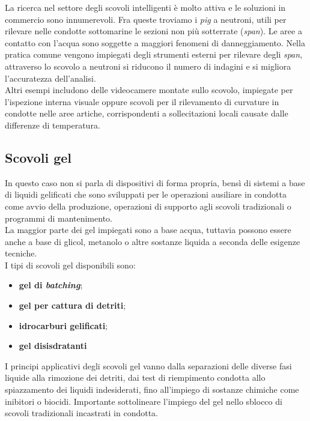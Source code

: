 La ricerca nel settore degli scovoli intelligenti è molto attiva e le soluzioni in commercio sono innumerevoli. Fra queste troviamo i \textit{pig} a neutroni, utili per rilevare nelle condotte sottomarine le sezioni non più sotterrate (\textit{span}). Le aree a contatto con l'acqua sono soggette a maggiori fenomeni di danneggiamento. Nella pratica comune vengono impiegati degli strumenti esterni per rilevare degli \textit{span}, attraverso lo scovolo a neutroni si riducono il numero di indagini e si migliora l'accuratezza dell'analisi.\\
Altri esempi includono delle videocamere montate sullo scovolo, impiegate per l'ispezione interna visuale oppure scovoli per il rilevamento di curvature in condotte nelle aree artiche, corrispondenti a sollecitazioni locali causate dalle differenze di temperatura.

\subsection{Scovoli gel}
In questo caso non si parla di dispositivi di forma propria, bensì di sistemi a base di liquidi gelificati che sono sviluppati per le operazioni ausiliare in condotta come avvio della produzione, operazioni di supporto agli scovoli tradizionali o programmi di mantenimento.\\
La maggior parte dei gel impiegati sono a base acqua, tuttavia possono essere anche a base di glicol, metanolo o altre sostanze liquida a seconda delle esigenze tecniche.\\
I tipi di scovoli gel disponibili sono:
\begin{itemize}
	\item \textbf{gel di \textit{batching}};
	\item \textbf{gel per cattura di detriti};
	\item \textbf{idrocarburi gelificati};
	\item \textbf{gel disisdratanti}
\end{itemize}

I principi applicativi degli scovoli gel vanno dalla separazioni delle diverse fasi liquide alla rimozione dei detriti, dai test di riempimento condotta allo spiazzamento dei liquidi indesiderati, fino all'impiego di sostanze chimiche come inibitori o biocidi. Importante sottolineare l'impiego del gel nello sblocco di scovoli tradizionali incastrati in condotta.

